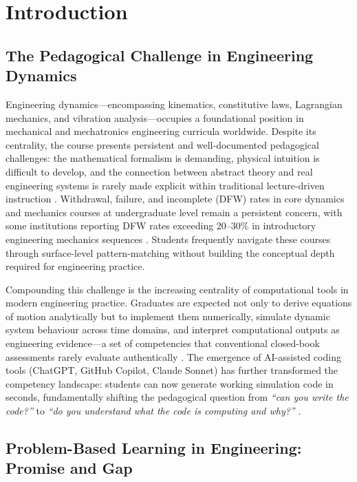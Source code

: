 \documentclass[utf8]{FrontiersinHarvard}
\begin{document}
\section{Introduction}

\subsection{The Pedagogical Challenge in Engineering Dynamics}

Engineering dynamics---encompassing kinematics, constitutive laws, Lagrangian
mechanics, and vibration analysis---occupies a foundational position in
mechanical and mechatronics engineering curricula worldwide. Despite its
centrality, the course presents persistent and well-documented pedagogical
challenges: the mathematical formalism is demanding, physical intuition is
difficult to develop, and the connection between abstract theory and real
engineering systems is rarely made explicit within traditional lecture-driven
instruction \citep{streveler2008learning}. Withdrawal, failure, and
incomplete (DFW) rates in core dynamics and mechanics courses at
undergraduate level remain a persistent concern, with some institutions
reporting DFW rates exceeding 20--30\% in introductory engineering
mechanics sequences \citep{crisp2009increasing}. Students frequently navigate
these courses through surface-level pattern-matching without building the
conceptual depth required for engineering practice.

Compounding this challenge is the increasing centrality of computational
tools in modern engineering practice. Graduates are expected not only to
derive equations of motion analytically but to implement them numerically,
simulate dynamic system behaviour across time domains, and interpret
computational outputs as engineering evidence---a set of competencies that
conventional closed-book assessments rarely evaluate authentically
\citep{justo2021enhancing}. The emergence of AI-assisted coding tools
(ChatGPT, GitHub Copilot, Claude Sonnet) has further transformed the
competency landscape: students can now generate working simulation code in
seconds, fundamentally shifting the pedagogical question from
\textit{``can you write the code?''} to \textit{``do you understand what
the code is computing and why?''} \citep{tlili2023chatgpt}.

\subsection{Problem-Based Learning in Engineering: Promise and Gap}
\end{document}
